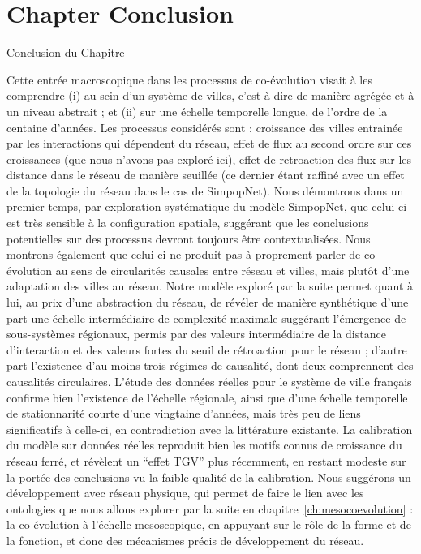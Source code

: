 

\newpage


\section*{Chapter Conclusion}{Conclusion du Chapitre}


Cette entrée macroscopique dans les processus de co-évolution visait à les comprendre (i) au sein d'un système de villes, c'est à dire de manière agrégée et à un niveau abstrait ; et (ii) sur une échelle temporelle longue, de l'ordre de la centaine d'années. Les processus considérés sont : croissance des villes entrainée par les interactions qui dépendent du réseau, effet de flux au second ordre sur ces croissances (que nous n'avons pas exploré ici), effet de retroaction des flux sur les distance dans le réseau de manière seuillée (ce dernier étant raffiné avec un effet de la topologie du réseau dans le cas de SimpopNet). Nous démontrons dans un premier temps, par exploration systématique du modèle SimpopNet, que celui-ci est très sensible à la configuration spatiale, suggérant que les conclusions potentielles sur des processus devront toujours être contextualisées. Nous montrons également que celui-ci ne produit pas à proprement parler de co-évolution au sens de circularités causales entre réseau et villes, mais plutôt d'une adaptation des villes au réseau. Notre modèle exploré par la suite permet quant à lui, au prix d'une abstraction du réseau, de révéler de manière synthétique d'une part une échelle intermédiaire de complexité maximale suggérant l'émergence de sous-systèmes régionaux, permis par des valeurs intermédiaire de la distance d'interaction et des valeurs fortes du seuil de rétroaction pour le réseau ; d'autre part l'existence d'au moins trois régimes de causalité, dont deux comprennent des causalités circulaires. L'étude des données réelles pour le système de ville français confirme bien l'existence de l'échelle régionale, ainsi que d'une échelle temporelle de stationnarité courte d'une vingtaine d'années, mais très peu de liens significatifs à celle-ci, en contradiction avec la littérature existante. La calibration du modèle sur données réelles reproduit bien les motifs connus de croissance du réseau ferré, et révèlent un ``effet TGV'' plus récemment, en restant modeste sur la portée des conclusions vu la faible qualité de la calibration. Nous suggérons un développement avec réseau physique, qui permet de faire le lien avec les ontologies que nous allons explorer par la suite en chapitre~\ref{ch:mesocoevolution} : la co-évolution à l'échelle mesoscopique, en appuyant sur le rôle de la forme et de la fonction, et donc des mécanismes précis de développement du réseau.
\comment[FL]{$\sim$}



\stars
